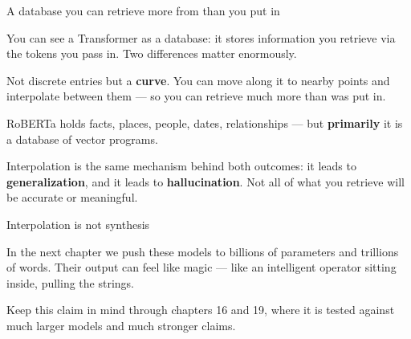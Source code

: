 \documentclass[aspectratio=169,11pt,t]{beamer}
\begin{document}
\begin{frame}[shrink=25]{A database you can retrieve more from than you put in}
{\fontsize{9.4}{12.6}\selectfont\color{fg2}You can see a Transformer as a database: it stores information you retrieve via the tokens you pass in. Two differences matter enormously.\par}\vskip 4pt
\begin{minipage}[t]{0.494\textwidth}
\begin{icardaccent}
Not discrete entries but a \textbf{curve}. You can move along it to nearby points and interpolate between them --- so you can retrieve much more than was put in.
\end{icardaccent}
\end{minipage}%
\hfill
\begin{minipage}[t]{0.494\textwidth}
\begin{icardaccent}
RoBERTa holds facts, places, people, dates, relationships --- but \textbf{primarily} it is a database of vector programs.
\end{icardaccent}
\end{minipage}%
\begin{iband}[rose]
Interpolation is the same mechanism behind both outcomes: it leads to \textbf{generalization}, and it leads to \textbf{hallucination}. Not all of what you retrieve will be accurate or meaningful.
\end{iband}
\end{frame}

\begin{frame}[shrink=25]{Interpolation is not synthesis}
{\fontsize{9.4}{12.6}\selectfont\color{fg2}In the next chapter we push these models to billions of parameters and trillions of words. Their output can feel like magic --- like an intelligent operator sitting inside, pulling the strings.\par}\vskip 4pt
\begin{iquote}
\end{iquote}
{\fontsize{9.4}{12.6}\selectfont\color{fg2}Keep this claim in mind through chapters 16 and 19, where it is tested against much larger models and much stronger claims.\par}\vskip 4pt
\end{frame}
\end{document}
